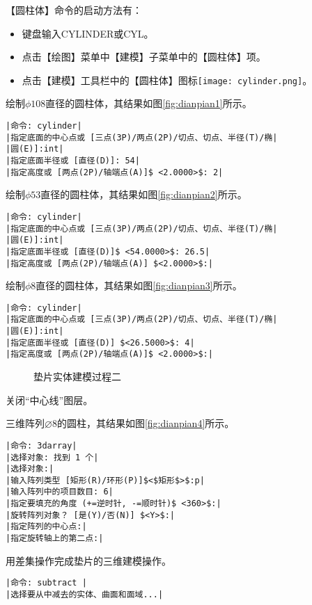 \begin{procedure}
【圆柱体】命令的启动方法有：
\begin{itemize}
\item 键盘输入CYLINDER或CYL。
\item 点击【绘图】菜单中【建模】子菜单中的【圆柱体】项。
\item 点击【建模】工具栏中的【圆柱体】图标\texttt{[image: cylinder.png]}。
\end{itemize}
绘制$\phi 108$直径的圆柱体，其结果如图\ref{fig:dianpian1}所示。
\begin{lstlisting}
|命令: cylinder|
|指定底面的中心点或 [三点(3P)/两点(2P)/切点、切点、半径(T)/椭|
|圆(E)]:int|
|指定底面半径或 [直径(D)]: 54|
|指定高度或 [两点(2P)/轴端点(A)]$ <2.0000>$: 2|
\end{lstlisting}
绘制$\phi 53$直径的圆柱体，其结果如图\ref{fig:dianpian2}所示。
\begin{lstlisting}
|命令: cylinder|
|指定底面的中心点或 [三点(3P)/两点(2P)/切点、切点、半径(T)/椭|
|圆(E)]:int|
|指定底面半径或 [直径(D)]$ <54.0000>$: 26.5|
|指定高度或 [两点(2P)/轴端点(A)] $<2.0000>$:|
\end{lstlisting}
绘制$\phi 8$直径的圆柱体，其结果如图\ref{fig:dianpian3}所示。
\begin{lstlisting}
|命令: cylinder|
|指定底面的中心点或 [三点(3P)/两点(2P)/切点、切点、半径(T)/椭|
|圆(E)]:int|
|指定底面半径或 [直径(D)] $<26.5000>$: 4|
|指定高度或 [两点(2P)/轴端点(A)]$ <2.0000>$:|
\end{lstlisting}
\begin{figure}[htbp]
\centering
{}\hspace{30pt}
\caption{垫片实体建模过程二}
\end{figure}
\item 关闭“中心线”图层。
\item 三维阵列$\diameter 8$的圆柱，其结果如图\ref{fig:dianpian4}所示。
\newpage
\begin{lstlisting}
|命令: 3darray|
|选择对象: 找到 1 个|
|选择对象:|
|输入阵列类型 [矩形(R)/环形(P)]$<$矩形$>$:p|
|输入阵列中的项目数目: 6|
|指定要填充的角度 (+=逆时针, -=顺时针)$ <360>$:|
|旋转阵列对象？ [是(Y)/否(N)] $<Y>$:|
|指定阵列的中心点:|
|指定旋转轴上的第二点:|
\end{lstlisting}
\item 用差集操作完成垫片的三维建模操作。
\begin{lstlisting}
|命令: subtract |
|选择要从中减去的实体、曲面和面域...|

\end{lstlisting}
\end{procedure}
